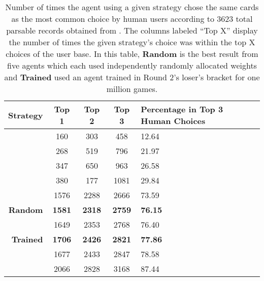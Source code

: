 
\begin{table}
	\centering

	\begin{tabular}{|r|c|c|c|p{4cm}|}
		\hline
		\textbf{Strategy} & \textbf{Top 1} & \textbf{Top 2} & \textbf{Top 3}
			& \textbf{Percentage in Top 3 Human Choices} \\
		\hline
		\peggingminavggiven & 160 & 303 & 458 & 12.64 \\\hline
		\peggingmaxmedgained & 268 & 519 & 796 & 21.97 \\\hline
		\peggingmaxavggained & 347 & 650 & 963 & 26.58 \\\hline
		\cribminavg & 380 & 177 & 1081 & 29.84 \\\hline
		\handmaxmin & 1576 & 2288 & 2666 & 73.59 \\\hline
		\textbf{Random} & \textbf{1581} & \textbf{2318} & \textbf{2759} &
			\textbf{76.15} \\\hline
		\handmaxmed & 1649 & 2353 & 2768 & 76.40 \\\hline
		\textbf{Trained} & \textbf{1706} & \textbf{2426} & \textbf{2821} &
			\textbf{77.86} \\\hline
		\handmaxposs & 1677 & 2433 & 2847 & 78.58 \\\hline
		\handmaxavg & 2066 & 2828 & 3168 & 87.44 \\\hline
	\end{tabular}
	\caption{
		Number of times the agent using a given strategy chose the same cards as
		the most common choice by human users
		according to 3623 total parsable records obtained from
		\cite{dailycribbagehand}.
		The columns labeled ``Top X'' display the number of times the given
		strategy's choice was within the top X choices of the user base.
		In this table,
		\textbf{Random} is the best result from five agents which each used
		independently randomly allocated weights
		and
		\textbf{Trained} used an agent trained in Round 2's loser's bracket
		for one million games.
	}
	\label{tab:expts-starts-human}
\end{table}
